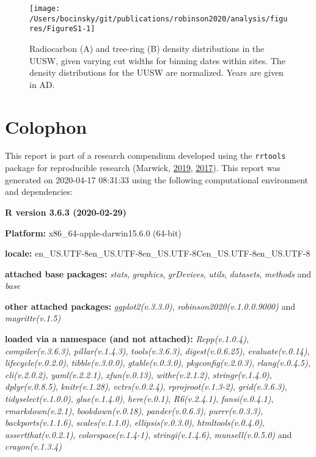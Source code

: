 \documentclass[
]{sa}
\begin{document}
\begin{figure}

{\centering \texttt{[image: /Users/bocinsky/git/publications/robinson2020/analysis/figures/FigureS1-1]} 

}

\caption{Radiocarbon (A) and tree-ring (B) density distributions in the UUSW, given varying cut widths for binning dates within sites. The density distributions for the UUSW are normalized. Years are given in AD.}\label{fig:FigureS1}
\end{figure}

\newpage

\hypertarget{colophon}{%
\section*{Colophon}\label{colophon}}

This report is part of a research compendium developed using the \texttt{rrtools} package for reproducible research (Marwick, \protect\hyperlink{ref-rrtools}{2019}, \protect\hyperlink{ref-Marwick2017}{2017}). This report was generated on 2020-04-17 08:31:33 using the following computational environment and dependencies:

\textbf{R version 3.6.3 (2020-02-29)}

\textbf{Platform:} x86\_64-apple-darwin15.6.0 (64-bit)

\textbf{locale:}
en\_US.UTF-8\textbar\textbar en\_US.UTF-8\textbar\textbar en\_US.UTF-8\textbar\textbar C\textbar\textbar en\_US.UTF-8\textbar\textbar en\_US.UTF-8

\textbf{attached base packages:}
\emph{stats}, \emph{graphics}, \emph{grDevices}, \emph{utils}, \emph{datasets}, \emph{methods} and \emph{base}

\textbf{other attached packages:}
\emph{ggplot2(v.3.3.0)}, \emph{robinson2020(v.1.0.0.9000)} and \emph{magrittr(v.1.5)}

\textbf{loaded via a namespace (and not attached):}
\emph{Rcpp(v.1.0.4)}, \emph{compiler(v.3.6.3)}, \emph{pillar(v.1.4.3)}, \emph{tools(v.3.6.3)}, \emph{digest(v.0.6.25)}, \emph{evaluate(v.0.14)}, \emph{lifecycle(v.0.2.0)}, \emph{tibble(v.3.0.0)}, \emph{gtable(v.0.3.0)}, \emph{pkgconfig(v.2.0.3)}, \emph{rlang(v.0.4.5)}, \emph{cli(v.2.0.2)}, \emph{yaml(v.2.2.1)}, \emph{xfun(v.0.13)}, \emph{withr(v.2.1.2)}, \emph{stringr(v.1.4.0)}, \emph{dplyr(v.0.8.5)}, \emph{knitr(v.1.28)}, \emph{vctrs(v.0.2.4)}, \emph{rprojroot(v.1.3-2)}, \emph{grid(v.3.6.3)}, \emph{tidyselect(v.1.0.0)}, \emph{glue(v.1.4.0)}, \emph{here(v.0.1)}, \emph{R6(v.2.4.1)}, \emph{fansi(v.0.4.1)}, \emph{rmarkdown(v.2.1)}, \emph{bookdown(v.0.18)}, \emph{pander(v.0.6.3)}, \emph{purrr(v.0.3.3)}, \emph{backports(v.1.1.6)}, \emph{scales(v.1.1.0)}, \emph{ellipsis(v.0.3.0)}, \emph{htmltools(v.0.4.0)}, \emph{assertthat(v.0.2.1)}, \emph{colorspace(v.1.4-1)}, \emph{stringi(v.1.4.6)}, \emph{munsell(v.0.5.0)} and \emph{crayon(v.1.3.4)}
\end{document}
